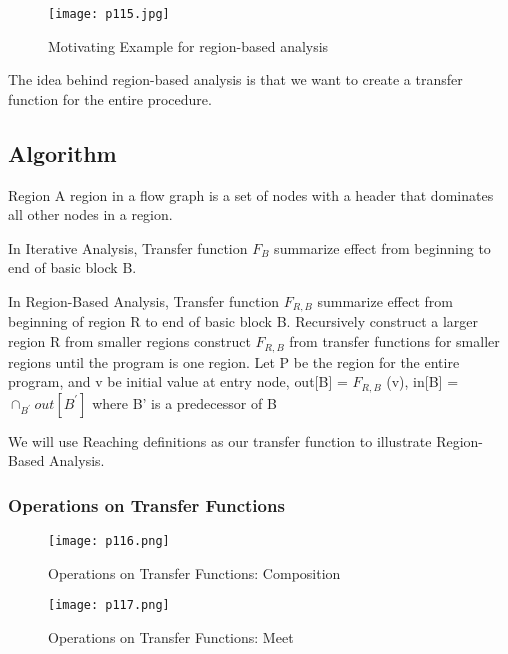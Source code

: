 \begin{figure}[H]
	\centering
	\texttt{[image: p115.jpg]}
	\caption{Motivating Example for region-based analysis}
	\label{fig:p115}
\end{figure}

The idea behind region-based analysis is that we want to create a transfer function for the entire procedure.



\subsection{Algorithm}


\begin{definition}{Region}
	A region in a flow graph is
	a set of nodes with a
	header that dominates all
	other nodes in a region.
\end{definition}

In Iterative Analysis, {\color{blue}Transfer function}
	{\color{red}\(F_B\)}
summarize effect from {\color{blue}beginning to end of basic block B}.

In Region-Based Analysis, {\color{blue}Transfer function}
	{\color{red}\(F_{R,B}\)}
summarize effect from {\color{blue}beginning of region
			{\color{red}R} to end of basic block B}. Recursively
construct a larger region  {\color{red}R} from smaller regions
construct {\color{red}\(F_{R,B}\)} from transfer functions for smaller
regions
until the program is one region.
Let P be the region for the entire program,
and v be initial value at entry node, {\color{blue}out[B] = {\color{red}\(F_{R,B}\)} (v)},
{\color{blue}in[B] = {\color{red}\( \cap_{B^\prime}out[B^\prime] \)}} where B’ is a predecessor of B


We will use Reaching definitions as our transfer function to illustrate Region-Based Analysis.


\subsubsection{Operations on Transfer Functions}

\begin{figure}[H]
	\centering
	\texttt{[image: p116.png]}
	\caption{Operations on Transfer Functions: Composition}
	\label{fig:p116}
\end{figure}

\begin{figure}[H]
	\centering
	\texttt{[image: p117.png]}
	\caption{Operations on Transfer Functions: Meet}
	\label{fig:p117}
\end{figure}

